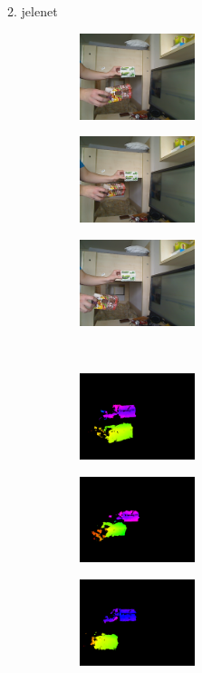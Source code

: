 \begin{frame}{2. jelenet}

\begin{figure}

\begin{subfigure}[b]{.32\linewidth}
	\centering
	\includegraphics[width=95pt]{figures/scene2/left_45.png}
  \end{subfigure}
\begin{subfigure}[b]{.32\linewidth}
	\centering
	\includegraphics[width=95pt]{figures/scene2/left_130.png}
  \end{subfigure}
\begin{subfigure}[b]{.32\linewidth}
	\centering
	\includegraphics[width=95pt]{figures/scene2/left_215.png}
  \end{subfigure}\\\vspace{5pt}
\begin{subfigure}[b]{.32\linewidth}
	\centering
	\includegraphics[width=95pt]{figures/scene2/vis_45.png}
  \end{subfigure}
\begin{subfigure}[b]{.32\linewidth}
	\centering
	\includegraphics[width=95pt]{figures/scene2/vis_130.png}
  \end{subfigure}
\begin{subfigure}[b]{.32\linewidth}
	\centering
	\includegraphics[width=95pt]{figures/scene2/vis_215.png}
  \end{subfigure}
  

\end{figure}
\end{frame}
